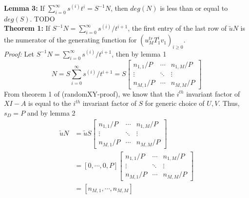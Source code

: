 \documentclass[12pt]{article}
\begin{document}
\noindent\textbf{Lemma 3:} If $\sum_{i = 0}^{\infty} s^{(i)} t^i = S^{-1}N$, then $deg(N)$ is
less than or equal to $deg(S)$. TODO\\

\noindent\textbf{Theorem 1:} If 
$S^{-1}N = \sum_{i=0}^{\infty} s^{(i)}/t^{i+1}$, the first entry
of the last row of $\tilde{u} N$ is  the numerator of the generating function for 
$(u_{M}^{tr} T_1^i v_{1})_{i \ge 0}$.\\

\noindent\textit{Proof:} Let $S^{-1}N = \sum_{i=0}^{\infty} s^{(i)}/t^{i+1}$, 
then by lemma 1 
$$ N = S \sum_{i=0}^{\infty} s^{(i)}/t^{i+1} = S 
\begin{bmatrix}
n_{1,1} / P & \cdots & n_{1,M} / P \\
\vdots      & \ddots & \vdots \\
n_{M,1} / P & \cdots & n_{M,M} / P
\end{bmatrix}
$$
From theorem 1 of (randomXY-proof), we know that the $i^{th}$ invariant factor of
$XI - A$ is equal to the $i^{th}$ invariant factor of $S$ for generic choice of
$U,V$. Thus, $s_D = P$ and by lemma 2
\begin{align*}
\tilde{u} N &= \tilde{u} S
				\begin{bmatrix}
				n_{1,1} / P & \cdots & n_{1,M} / P \\
				\vdots            & \ddots & \vdots \\
				n_{M,1} / P & \cdots & n_{M,M} / P
				\end{bmatrix} \\
            &= [0,\cdots,0,P]
               \begin{bmatrix}
               n_{1,1} / P & \cdots & n_{1,M} / P \\
               \vdots            & \ddots & \vdots \\
               n_{M,1} / P & \cdots & n_{M,M} / P
               \end{bmatrix}\\
            &= [n_{M,1} , \cdots , n_{M,M}]
\end{align*}
\end{document}
